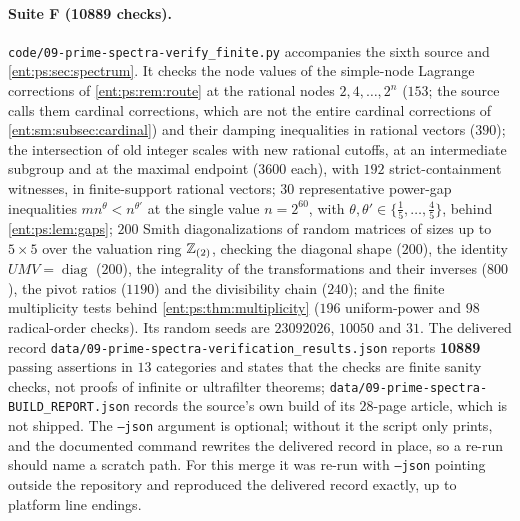 \documentclass[11pt]{article}
\theoremstyle{plain}
\theoremstyle{plain}
\theoremstyle{plain}
\theoremstyle{definition}
\theoremstyle{definition}
\theoremstyle{definition}
\theoremstyle{definition}
\theoremstyle{remark}
\begin{document}
\paragraph{Suite F (10889 checks).}
\texttt{code/09-prime-spectra-verify\_finite.py} accompanies the sixth source
and \cref{ent:ps:sec:spectrum}. It checks the node values of the
simple-node Lagrange corrections of \cref{ent:ps:rem:route} at the rational
nodes $2,4,\ldots,2^n$ ($153$; the source calls them cardinal corrections,
which are not the entire cardinal corrections of
\cref{ent:sm:subsec:cardinal}) and their damping inequalities in rational
vectors ($390$); the
intersection of old integer scales with new rational cutoffs, at an
intermediate subgroup and at the maximal endpoint ($3600$ each), with $192$
strict-containment witnesses, in finite-support rational vectors; $30$
representative power-gap inequalities $mn^{\theta}<n^{\theta'}$ at the single
value $n=2^{60}$, with $\theta,\theta'\in\{\tfrac15,\ldots,\tfrac45\}$, behind
\cref{ent:ps:lem:gaps}; $200$ Smith diagonalizations of random matrices of
sizes up to $5\times5$ over the valuation ring $\mathbb Z_{(2)}$, checking the
diagonal shape ($200$), the identity $UMV=\operatorname{diag}$ ($200$), the
integrality of the transformations and their inverses ($800$), the pivot
ratios ($1190$) and the divisibility chain ($240$); and the finite
multiplicity tests behind \cref{ent:ps:thm:multiplicity} ($196$ uniform-power
and $98$ radical-order checks). Its random seeds are $23092026$, $10050$ and
$31$. The delivered record \texttt{data/09-prime-spectra-verification\_results.json}
reports \textbf{10889} passing assertions in $13$ categories and states that
the checks are finite sanity checks, not proofs of infinite or ultrafilter
theorems; \texttt{data/09-prime-spectra-BUILD\_REPORT.json} records the
source's own build of its $28$-page article, which is not shipped. The
\texttt{--json} argument is optional; without it the script only prints, and
the documented command rewrites the delivered record in place, so a re-run
should name a scratch path. For this merge it was re-run with \texttt{--json}
pointing outside the repository and reproduced the delivered record exactly,
up to platform line endings.
\end{document}
